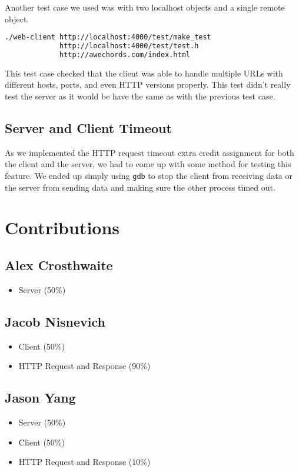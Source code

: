 \documentclass{article}
\begin{document}
Another test case we used was with two localhost objects and a single remote object.

\begin{lstlisting}[language=bash]
./web-client http://localhost:4000/test/make_test 
             http://localhost:4000/test/test.h
             http://awechords.com/index.html
\end{lstlisting}

\noindent
This test case checked that the client was able to handle multiple URLs with different hosts, ports, and even HTTP versions properly. This test didn't really test the server as it would be have the same as with the previous test case.

\subsection{Server and Client Timeout}

As we implemented the HTTP request timeout extra credit assignment for both the client and the server, we had to come up with some method for testing this feature. We ended up simply using \texttt{gdb} to stop the client from receiving data or the server from sending data and making sure the other process timed out.

\section{Contributions}

\subsection{Alex Crosthwaite}

\begin{itemize}
	\item Server (50\%)
\end{itemize}

\subsection{Jacob Nisnevich}

\begin{itemize}
	\item Client (50\%)
	\item HTTP Request and Response (90\%)
\end{itemize}

\subsection{Jason Yang}

\begin{itemize}
	\item Server (50\%)
	\item Client (50\%)
	\item HTTP Request and Response (10\%)
\end{itemize}
\end{document}
